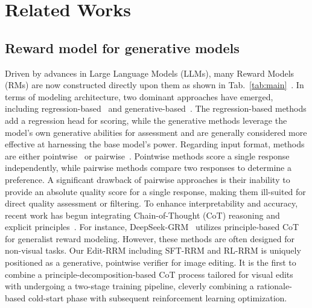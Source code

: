 \section{Related Works}
\label{sec:realted}

\subsection{Reward model for generative models}
Driven by advances in Large Language Models (LLMs), many Reward Models (RMs) are now constructed directly upon them as shown in Tab.~\ref{tab:main}~\citep{ren2024byteedit,wu2025rewarddance,gong2025seedream,ma2025hpsv3}. 
In terms of modeling architecture, two dominant approaches have emerged, including regression-based~\citep{liu2025improving, wang2025worldpm} and generative-based~\citep{wu2025rewarddance,gong2025onereward,hong2025think}. The regression-based methods add a regression head for scoring, while the generative methods leverage the model's own generative abilities for assessment and are generally considered more effective at harnessing the base model's power. 
Regarding input format, methods are either pointwise~\citep{wu2025visualquality,wei2025skywork} or pairwise~\citep{wang2025unified, wu2025rewarddance}. Pointwise methods score a single response independently, while pairwise methods compare two responses to determine a preference. 
A significant drawback of pairwise approaches is their inability to provide an absolute quality score for a single response, making them ill-suited for direct quality assessment or filtering.
To enhance interpretability and accuracy, recent work has begun integrating Chain-of-Thought (CoT) reasoning and explicit principles~\citep{liu2025inference, wang2025unified}. For instance, DeepSeek-GRM~\citep{liu2025inference} utilizes principle-based CoT for generalist reward modeling. However, these methods are often designed for non-visual tasks. 
Our Edit-RRM including SFT-RRM and RL-RRM is uniquely positioned as a generative, pointwise verifier for image editing. It is the first to combine a principle-decomposition-based CoT process tailored for visual edits with undergoing a two-stage training pipeline, cleverly combining a rationale-based cold-start phase with subsequent reinforcement learning optimization.



